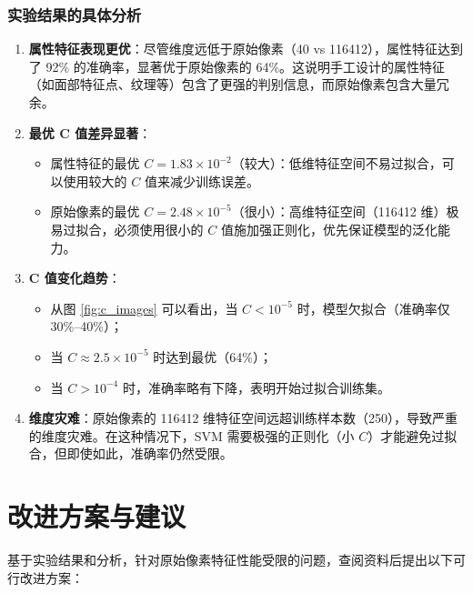 \documentclass[UTF8]{ctexart}
\begin{document}
\subsubsection{实验结果的具体分析}
\begin{enumerate}
    \item \textbf{属性特征表现更优}：尽管维度远低于原始像素（40 vs 116412），属性特征达到了 92\% 的准确率，显著优于原始像素的 64\%。这说明手工设计的属性特征（如面部特征点、纹理等）包含了更强的判别信息，而原始像素包含大量冗余。
    
    \item \textbf{最优 C 值差异显著}：
    \begin{itemize}
        \item 属性特征的最优 $C = 1.83 \times 10^{-2}$（较大）：低维特征空间不易过拟合，可以使用较大的 $C$ 值来减少训练误差。
        \item 原始像素的最优 $C = 2.48 \times 10^{-5}$（很小）：高维特征空间（116412 维）极易过拟合，必须使用很小的 $C$ 值施加强正则化，优先保证模型的泛化能力。
    \end{itemize}
    
    \item \textbf{C 值变化趋势}：
    \begin{itemize}
        \item 从图 \ref{fig:c_images} 可以看出，当 $C < 10^{-5}$ 时，模型欠拟合（准确率仅 30\%--40\%）；
        \item 当 $C \approx 2.5 \times 10^{-5}$ 时达到最优（64\%）；
        \item 当 $C > 10^{-4}$ 时，准确率略有下降，表明开始过拟合训练集。
    \end{itemize}
    
    \item \textbf{维度灾难}：原始像素的 116412 维特征空间远超训练样本数（250），导致严重的维度灾难。在这种情况下，SVM 需要极强的正则化（小 $C$）才能避免过拟合，但即使如此，准确率仍然受限。
\end{enumerate}

\section{改进方案与建议}

基于实验结果和分析，针对原始像素特征性能受限的问题，查阅资料后提出以下可行改进方案：
\end{document}
